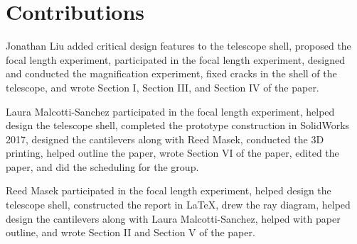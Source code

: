 \section{Contributions}
\label{sec:Contributions}
Jonathan Liu added critical design features to the telescope shell, proposed the focal length experiment, participated in the focal length experiment, designed and conducted the magnification experiment, fixed cracks in the shell of the telescope, and wrote Section I, Section III, and Section IV of the paper. 

Laura Malcotti-Sanchez participated in the focal length experiment, helped design the telescope shell, completed the prototype construction in SolidWorks 2017, designed the cantilevers along with Reed Masek, conducted the 3D printing, helped outline the paper, wrote Section VI of the paper, edited the paper, and did the scheduling for the group.

Reed Masek participated in the focal length experiment, helped design the telescope shell, constructed the report in \LaTeX, drew the ray diagram, helped design the cantilevers along with Laura Malcotti-Sanchez, helped with paper outline, and wrote Section II and Section V of the paper.
